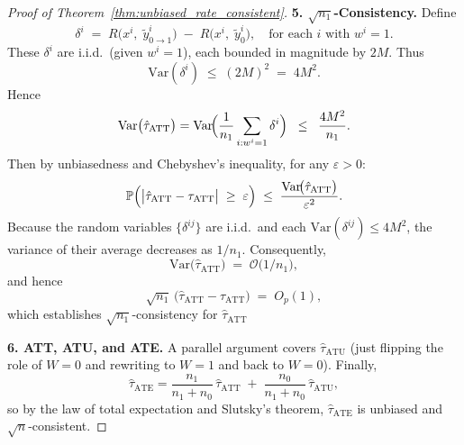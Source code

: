 \documentclass{article}
\theoremstyle{definition}
\begin{document}
\begin{proof}[Proof of Theorem~\ref{thm:unbiased_rate_consistent}]
    \bigskip
    \textbf{5. \(\sqrt{n_1}\)-Consistency.}
    Define 
    \[
    \delta^i
    \;=\;
    R\bigl(x^i,\;\tilde{y}^{i}_{0\to1}\bigr)
    \;-\;
    R\bigl(x^i,\;\tilde{y}^{i}_{0}\bigr),
    \quad
    \text{for each }i\text{ with }w^i=1.
    \]
    These \(\delta^i\) are i.i.d.\ (given \(w^i=1\)), each bounded in magnitude by \(2M\). Thus
    \[
    \mathrm{Var}(\delta^i) 
    \;\le\; (2M)^2 
    \;=\; 4M^2.
    \]
    Hence
    \[
    \mathrm{Var}\bigl(\hat{\tau}_{\text{ATT}}\bigr)
    =
    \mathrm{Var}\!\Bigl(\frac{1}{n_1}\sum_{i: w^i=1}\delta^i\Bigr)
    \;\;\le\;\;
    \frac{4M^2}{n_1}.
    \]
    Then by unbiasedness and Chebyshev's inequality, for any $\varepsilon>0$:
    \[
    \mathbb{P}\Bigl(\bigl|\hat{\tau}_{\text{ATT}} - \tau_{\text{ATT}}\bigr|\;\ge\;\varepsilon\Bigr)
    \;\le\;
    \frac{\mathrm{Var}\!\bigl(\hat{\tau}_{\text{ATT}}\bigr)}{\varepsilon^2}.
    \]
    Because the random variables $\{\delta^{ij}\}$ are i.i.d.\ and each $\mathrm{Var}(\delta^{ij})\le4M^2$, the variance of their average decreases as $1/n_1$.  Consequently,
    \[
    \mathrm{Var}\bigl(\hat{\tau}_{\text{ATT}}\bigr)\;=\;\mathcal{O}\!\bigl(1/n_1\bigr),
    \]
    and hence 
    \[
    \sqrt{n_1}\,\bigl(\hat{\tau}_{\text{ATT}} - \tau_{\text{ATT}}\bigr)
    \;=\;
    O_{p}(1),
    \]
    which establishes $\sqrt{n_1}$-consistency for $\hat{\tau}_{\text{ATT}}$
    
    \bigskip
    \textbf{6. ATT, ATU, and ATE.}
    A parallel argument covers \(\hat{\tau}_{\text{ATU}}\) (just flipping the role of \(W=0\) and rewriting to \(W=1\) and back to \(W=0\)).  Finally,
    \[
    \hat{\tau}_{\text{ATE}}
    =
    \frac{n_1}{n_1 + n_0}\,\hat{\tau}_{\text{ATT}}
    \;+\;
    \frac{n_0}{n_1 + n_0}\,\hat{\tau}_{\text{ATU}},
    \]
    so by the law of total expectation and Slutsky’s theorem,
    \(\hat{\tau}_{\text{ATE}}\) is unbiased and \(\sqrt{n}\)-consistent.  
\end{proof}

\newpage


\end{document}
